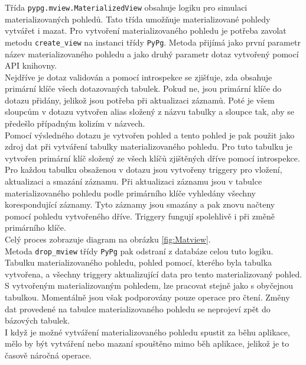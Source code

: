 \documentclass[ing,male,java,dept456]{diploma}						%
\begin{document}
Třída \lstinline[style=inlinepython]|pypg.mview.MaterializedView| obsahuje logiku pro simulaci materializovaných pohledů. Tato třída umožňuje materializované pohledy vytvářet i mazat. Pro vytvoření materializovaného pohledu je potřeba zavolat metodu \lstinline[style=inlinepython]|create_view| na instanci třídy \lstinline[style=inlinepython]|PyPg|. Metoda přijímá jako první parametr název materializovaného pohledu a jako druhý parametr dotaz vytvořený pomocí API knihovny. \\
Nejdříve je dotaz validován a pomocí introspekce se zjišťuje, zda obsahuje primární klíče všech dotazovaných tabulek. Pokud ne, jsou primární klíče do dotazu přidány, jelikož jsou potřeba při aktualizaci záznamů. Poté je všem sloupcům v dotazu vytvořen alias složený z názvu tabulky a sloupce tak, aby se předešlo případným kolizím v názvech. \\
Pomocí výsledného dotazu je vytvořen pohled a tento pohled je pak použit jako zdroj dat při vytváření tabulky materializovaného pohledu. Pro tuto tabulku je vytvořen primární klíč složený ze všech klíčů zjištěných dříve pomocí introspekce. \\
Pro každou tabulku obsaženou v dotazu jsou vytvořeny triggery pro vložení, aktualizaci a smazání záznamu. Při aktualizaci záznamu jsou v tabulce materializovaného pohledu podle primárního klíče vyhledány všechny korespondující záznamy. Tyto záznamy jsou smazány a pak znovu načteny pomocí pohledu vytvořeného dříve. Triggery fungují spolehlivě i při změně primárního klíče. \\
Celý proces zobrazuje diagram na obrázku \ref{fig:Matview}. \\
Metoda \lstinline[style=inlinepython]|drop_mview| třídy \lstinline[style=inlinepython]|PyPg| pak odstraní z databáze celou tuto logiku. Tabulku materializovaného pohledu, pohled pomocí, kterého byla tabulka vytvořena, a všechny triggery aktualizující data pro tento materializovaný pohled. \\
S vytvořeným materializovaným pohledem, lze pracovat stejně jako s obyčejnou tabulkou. Momentálně jsou však podporovány pouze operace pro čtení. Změny dat provedené na tabulce materializovaného pohledu se neprojeví zpět do bázových tabulek. \\
I když je možné vytváření materializovaného pohledu spustit za běhu aplikace, mělo by být vytváření nebo mazaní spouštěno mimo běh aplikace, jelikož je to časově náročná operace. \\

\end{document}
